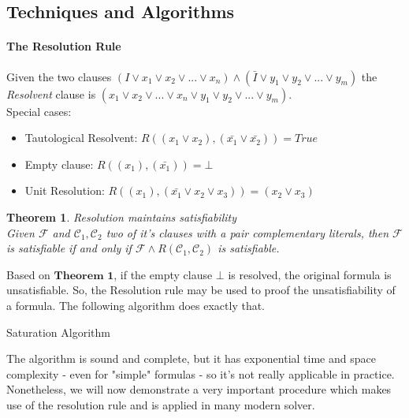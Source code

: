 \documentclass[]{article}
\newtheorem{theorem}{Theorem}
\begin{document}
	\subsection{Techniques and Algorithms}
	\paragraph{The Resolution Rule} Given the two clauses $ (I \lor x_1 \lor x_2 \lor ... \lor x_n)  \land (\bar{I} \lor y_1 \lor y_2 \lor ... \lor y_m)$ the \textit{Resolvent} clause is $ (x_1 \lor x_2 \lor ... \lor x_n \lor y_1 \lor y_2 \lor ... \lor y_m) $. \\
	Special cases:
	\begin{itemize}
		\item Tautological Resolvent: $ R((x_1 \lor x_2), (\bar{x_1} \lor \bar{x_2})) = True $
		\item Empty clause: $ R((x_1), (\bar{x_1})) = \bot $
		\item Unit Resolution: $ R((x_1), (\bar{x_1} \lor x_2 \lor x_3)) = (x_2 \lor x_3)$
	\end{itemize}
	
	\begin{theorem}
		Resolution maintains satisfiability\\
		Given $ \mathcal{F} $ and $ \mathcal{C}_1, \mathcal{C}_2 $ two of it's clauses with a pair complementary literals, then $ \mathcal{F} $ is satisfiable if and only if $ \mathcal{F} \land R(\mathcal{C}_1, \mathcal{C}_2) $ is satisfiable.
	\end{theorem}
	Based on $\textbf{Theorem 1}$, if the empty clause $\bot$ is resolved, the original formula is unsatisfiable. So, the Resolution rule may be used to proof the unsatisfiability of a formula. The following algorithm does exactly that.
	\pagebreak
	
	\begin{algorithm}[H]
	\caption{Saturation Algorithm}
	\end{algorithm}
	The algorithm is sound and complete, but it has exponential time and space complexity - even for "simple" formulas - so it's not really applicable in practice. Nonetheless, we will now demonstrate a very important procedure which makes use of the resolution rule and is applied in many modern solver.
\end{document}
